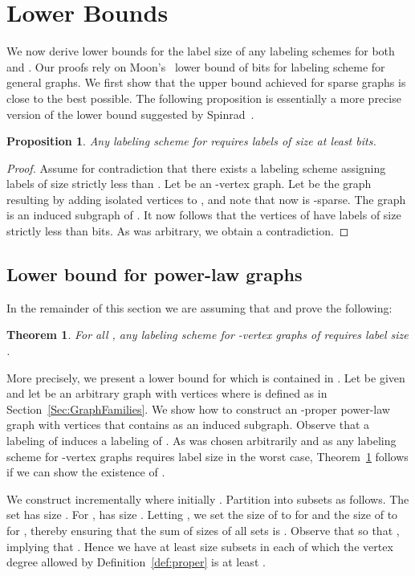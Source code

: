 \documentclass{article}
\newtheorem{theorem}{Theorem}
\newtheorem{proposition}{Proposition}
\theoremstyle{remark}
\begin{document}
\section{Lower Bounds}
We now derive lower bounds for the label size of any  labeling schemes for both  and  .
Our proofs rely on  Moon's~\cite{moon1965minimal} lower bound of   bits for labeling scheme for general graphs.
We first show that the upper bound achieved for sparse graphs is close to the best possible.
The following proposition is essentially a more precise version of the lower bound suggested by Spinrad~\cite{spinrad2003efficient}.
\begin{proposition}
Any  labeling scheme for  requires  labels of size at least  bits.
\end{proposition}
\begin{proof}
Assume for contradiction that there exists a labeling scheme  assigning labels of size strictly less than .
Let  be an -vertex graph. Let  be the graph resulting by adding  isolated vertices to , and note that now  is -sparse. The graph  is an induced subgraph of  .
It now follows that the vertices of  have  labels of size strictly less than 
 bits. As  was arbitrary, we obtain a contradiction.
\end{proof}

\subsection{Lower bound for power-law graphs}
In the remainder of this section we are assuming that  and  prove the following:
\begin{theorem}\label{centralLowerBound}
For all , any labeling scheme for -vertex graphs of  requires label size .
\end{theorem}
More precisely, we present a lower bound for  which is contained in . Let  be given and let  be an arbitrary graph with  vertices where  is defined as in Section~\ref{Sec:GraphFamilies}. We show how to construct an -proper power-law graph  with  vertices that contains  as an induced subgraph. Observe that a labeling of  induces a labeling of . As  was chosen arbitrarily and as any labeling scheme for -vertex graphs requires  label size in the worst case, Theorem~\ref{centralLowerBound} follows if we can show the existence of .

We construct  incrementally where initially . Partition  into subsets  as follows. The set  has size . For ,  has size . Letting , we set the size of  to  for  and the size of  to  for , thereby ensuring that the sum of sizes of all sets is . Observe that  so that , implying that . Hence we have at least  size  subsets  in each of which the vertex degree allowed by Definition~\ref{def:proper} is at least .
\end{document}
